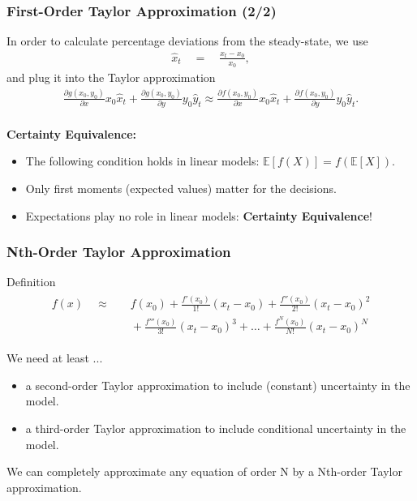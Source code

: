\documentclass[10pt,c,aspectratio=1610,handout]{beamer}
\begin{document}
\begin{frame}%
  \frametitle{First-Order Taylor Approximation (2/2)}%
  In order to calculate percentage deviations from the steady-state, we use%
  \begin{align*}%
    \hat{x}_t \quad = \quad \frac{x_t-x_0}{x_0},%
  \end{align*}%
  and plug it into the Taylor approximation%
  \begin{align*}%
    \frac{\partial g\left(x_0,y_0\right)}{\partial x} x_0 \hat{x}_t + \frac{\partial g\left(x_0,y_0\right)}{\partial y}y_0 \hat{y}_t \approx \frac{\partial f\left(x_0,y_0\right)}{\partial x} x_0 \hat{x}_t + \frac{\partial f\left(x_0,y_0\right)}{\partial y}y_0 \hat{y}_t.%
  \end{align*}\\%
  \pause%
  \vspace*{0.2in}%
  \textbf{Certainty Equivalence:}%
  \begin{itemize}%
    \item[$\blacktriangleright$] The following condition holds in linear models: $\mathbb{E} \left[f\left(X\right)\right] = f\left(\mathbb{E}\left[X\right]\right)$.%
    \item[$\blacktriangleright$] Only first moments (expected values) matter for the decisions.%
    \item[$\blacktriangleright$] Expectations play no role in linear models: \textbf{Certainty Equivalence}!%
  \end{itemize}%
\end{frame}%
\begin{frame}%
  \frametitle{Nth-Order Taylor Approximation}%
  \begin{block}{Definition}%
    \begin{align}%
      \begin{split}%
        f\left(x\right) \quad \approx & \quad f\left(x_0\right) + \frac{f'\left(x_0\right)}{1!} \left(x_t-x_0\right) + \frac{f''\left(x_0\right)}{2!} \left(x_t-x_0\right)^2\\%
        & \quad + \frac{f'''\left(x_0\right)}{3!} \left(x_t-x_0\right)^3 + \dots + \frac{f^N\left(x_0\right)}{N!} \left(x_t-x_0\right)^N%
      \end{split}%
    \end{align}%
  \end{block}%
  \pause%
  We need at least ...%
  \begin{itemize}%
    \item[$\blacktriangleright$] a second-order Taylor approximation to include (constant) uncertainty in the model.%
    \item[$\blacktriangleright$] a third-order Taylor approximation to include conditional uncertainty in the model.%
  \end{itemize}%
  \vspace*{0.15in}%
  We can completely approximate any equation of order N by a Nth-order Taylor approximation.%
\end{frame}%
\end{document}

